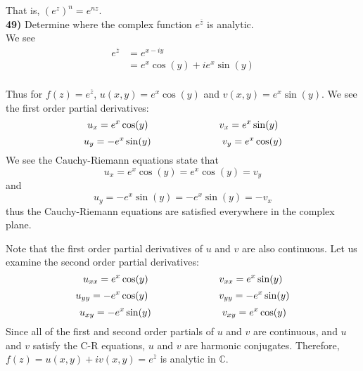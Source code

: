\documentclass{scrartcl}
\begin{document}
That is, $\left(e^z\right)^n = e^{nz}$.\\

\textbf{49)} Determine where the complex function $e^{\overline{z}}$ is analytic.\\

We see
\begin{align*}
  e^{\overline{z}} &= e^{x-iy}\\
  &= e^x\cos(y) + ie^x\sin(y)\\
\end{align*}

Thus for $f(z) = e^{\overline{z}}$, $u(x,y) = e^x\cos(y)$ and $v(x,y) = e^x\sin(y)$. We see the first order partial derivatives:
$$ u_x = e^x\cos(y) \text{\hspace{1in}} v_x = e^x\sin(y)$$
$$ u_y = -e^x\sin(y) \text{\hspace{1in}} v_y = e^x\cos(y)$$
We see the Cauchy-Riemann equations state that $$u_x = e^x\cos(y) = e^x\cos(y) = v_y$$ and $$u_y = -e^x\sin(y) = -e^x\sin(y) = -v_x$$ thus the Cauchy-Riemann equations are satisfied everywhere in the complex plane.

Note that the first order partial derivatives of $u$ and $v$ are also continuous. Let us examine the second order partial derivatives:
$$ u_{xx} = e^x\cos(y) \text{\hspace{1in}} v_{xx} = e^x\sin(y)$$
$$ u_{yy} = -e^x\cos(y) \text{\hspace{1in}} v_{yy} = -e^x\sin(y)$$
$$ u_{xy} = -e^x\sin(y) \text{\hspace{1in}} v_{xy} = e^x\cos(y)$$
Since all of the first and second order partials of $u$ and $v$ are continuous, and $u$ and $v$ satisfy the C-R equations, $u$ and $v$ are harmonic conjugates. Therefore, $f(z) = u(x,y) + iv(x,y) = e^{\overline{z}}$ is analytic in $\mathbb{C}$.
\end{document}
